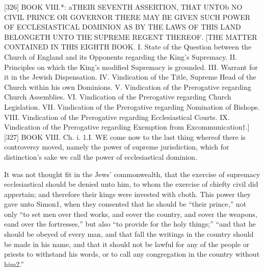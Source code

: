 
[326]
BOOK VIII.*: aTHEIR SEVENTH ASSERTION, THAT UNTOb NO CIVIL PRINCE OR GOVERNOR THERE MAY BE GIVEN SUCH POWER OF ECCLESIASTICAL DOMINION AS BY THE LAWS OF THIS LAND BELONGETH UNTO THE SUPREME REGENT THEREOF.
[THE MATTER CONTAINED IN THIS EIGHTH BOOK.
I. State of the Question between the Church of England and its Opponents regarding the King’s Supremacy.
II. Principles on which the King’s modified Supremacy is grounded.
III. Warrant for it in the Jewish Dispensation.
IV. Vindication of the Title, Supreme Head of the Church within his own Dominions.
V. Vindication of the Prerogative regarding Church Assemblies.
VI. Vindication of the Prerogative regarding Church Legislation.
VII. Vindication of the Prerogative regarding Nomination of Bishops.
VIII. Vindication of the Prerogative regarding Ecclesiastical Courts.
IX. Vindication of the Prerogative regarding Exemption from Excommunication†.]
[327]
BOOK VIII. Ch. i. 1.I. WE come now to the last thing whereof there is controversy moved, namely the power of supreme jurisdiction, which for distinction’s sake we call the power of ecclesiastical dominion.

It was not thought fit in the Jews’ commonwealth, that the exercise of supremacy ecclesiastical should be denied unto him, to whom the exercise of chiefty civil did appertain; and therefore their kings were invested with cboth. This power they gave unto Simon1, when they consented that he should be “their prince,” not only “to set men over thed works, and eover the country, and eover the weapons, eand over the fortresses,” but also “to provide for the holy things;” “and that he should be obeyed of every man, and that fall the writings in the country should be made in his name, and that it should not be lawful for any of the people or priests to withstand his words, or to call any congregation in the country without him2.”

